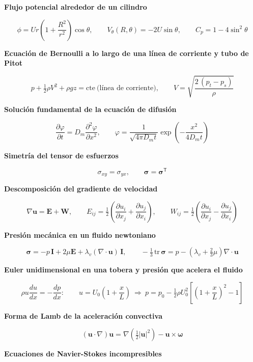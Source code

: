 \documentclass[10pt,openany]{book}
\begin{document}
\noindent\textbf{Flujo potencial alrededor de un cilindro}

\[
\phi = U r\left(1 + \frac{R^{2}}{r^{2}}\right)\cos\theta,\qquad V_\theta(R,\theta) = -2U\sin\theta,\qquad C_p = 1 - 4\sin^{2}\theta
\]

\noindent\textbf{Ecuación de Bernoulli a lo largo de una línea de corriente y tubo de Pitot}

\[
p + \tfrac12\rho V^{2} + \rho g z = \mathrm{cte}\ \text{(línea de corriente)},\qquad V = \sqrt{\frac{2\,(p_t - p_s)}{\rho}}
\]

\noindent\textbf{Solución fundamental de la ecuación de difusión}

\[
\frac{\partial\varphi}{\partial t} = D_m\frac{\partial^{2}\varphi}{\partial x^{2}},\qquad \varphi = \frac{1}{\sqrt{4\pi D_m t}}\exp\!\left(-\frac{x^{2}}{4D_m t}\right)
\]

\noindent\textbf{Simetría del tensor de esfuerzos}

\[
\sigma_{xy} = \sigma_{yx},\qquad \boldsymbol{\sigma} = \boldsymbol{\sigma}^{\mathsf{T}}
\]

\noindent\textbf{Descomposición del gradiente de velocidad}

\[
\nabla\mathbf{u} = \mathbf{E} + \mathbf{W},\qquad E_{ij} = \tfrac12\left(\frac{\partial u_i}{\partial x_j} + \frac{\partial u_j}{\partial x_i}\right),\qquad W_{ij} = \tfrac12\left(\frac{\partial u_i}{\partial x_j} - \frac{\partial u_j}{\partial x_i}\right)
\]

\noindent\textbf{Presión mecánica en un fluido newtoniano}

\[
\boldsymbol{\sigma} = -p\,\mathbf{I} + 2\mu\mathbf{E} + \lambda_v(\nabla\cdot\mathbf{u})\,\mathbf{I},\qquad -\tfrac13\,\mathrm{tr}\,\boldsymbol{\sigma} = p - \left(\lambda_v + \tfrac23\mu\right)\nabla\cdot\mathbf{u}
\]

\noindent\textbf{Euler unidimensional en una tobera y presión que acelera el fluido}

\[
\rho u\frac{du}{dx} = -\frac{dp}{dx}:\qquad u = U_0\left(1 + \frac{x}{L}\right)\ \Rightarrow\ p = p_0 - \tfrac12\rho U_0^{2}\left[\left(1 + \frac{x}{L}\right)^{2} - 1\right]
\]

\noindent\textbf{Forma de Lamb de la aceleración convectiva}

\[
(\mathbf{u}\cdot\nabla)\mathbf{u} = \nabla\!\left(\tfrac12|\mathbf{u}|^{2}\right) - \mathbf{u}\times\boldsymbol{\omega}
\]

\noindent\textbf{Ecuaciones de Navier-Stokes incompresibles}
\end{document}
